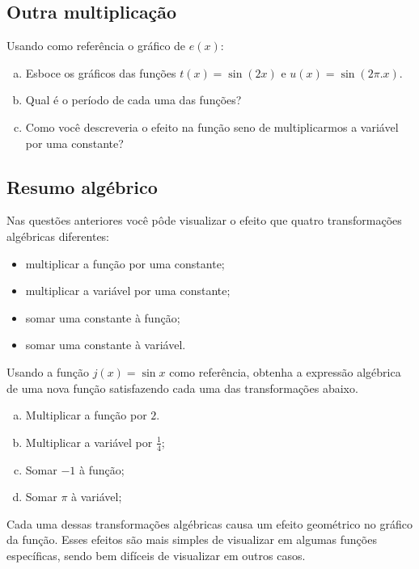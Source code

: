 \documentclass[main_estudante.tex]{subfiles}
\begin{document}
\subsection*{Outra multiplicação}

\begin{questao}
Usando como referência o gráfico de $e(x)$:
\begin{enumerate}[a)]
\item Esboce os gráficos das funções $t(x)=\sin(2x)$ e $u(x)=\sin(2\pi.x)$.
\item Qual é o período de cada uma das funções?
\item Como você descreveria o efeito na função seno de multiplicarmos a variável por uma constante?
\end{enumerate}
\end{questao}

\subsection*{Resumo algébrico}

Nas questões anteriores você pôde visualizar o efeito que quatro transformações algébricas diferentes:

\begin{itemize}
 \item multiplicar a função por uma constante;
 \item multiplicar a variável por uma constante;
 \item somar uma constante à função;
 \item somar uma constante à variável.
\end{itemize}

\begin{questao}
Usando a função $j(x)=\sin{x}$ como referência, obtenha a expressão algébrica de uma nova função satisfazendo cada uma das transformações abaixo.
\begin{enumerate}[a)]
\item Multiplicar a função por $2$.
\item Multiplicar a variável por $\frac{1}{4}$;
\item Somar $-1$ à função;
\item Somar $\pi$ à variável;
\end{enumerate}
\end{questao}

Cada uma dessas transformações algébricas causa um efeito geométrico no gráfico da função. Esses efeitos são mais simples de visualizar em algumas funções específicas, sendo bem difíceis de visualizar em outros casos. 
\end{document}
